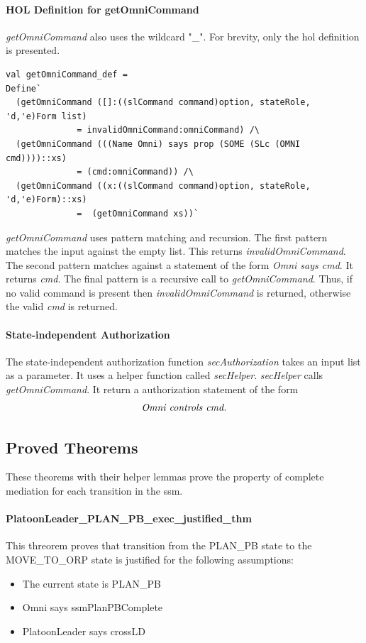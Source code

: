 \documentclass[../../main/main.tex]{subfiles}
\begin{document}
\paragraph*{HOL Definition for getOmniCommand}
\textit{getOmniCommand} also uses the wildcard "_".  For brevity, only the \gls{hol} definition is presented.

\begin{lstlisting}
val getOmniCommand_def =
Define`
  (getOmniCommand ([]:((slCommand command)option, stateRole, 'd,'e)Form list)
  		      = invalidOmniCommand:omniCommand) /\
  (getOmniCommand (((Name Omni) says prop (SOME (SLc (OMNI cmd))))::xs)
  		      = (cmd:omniCommand)) /\
  (getOmniCommand ((x:((slCommand command)option, stateRole, 'd,'e)Form)::xs)
  		      =  (getOmniCommand xs))`
\end{lstlisting}

\textit{getOmniCommand}  uses pattern matching and recursion.  The first pattern matches the input against the empty list.  This returns \textit{invalidOmniCommand}.  The second pattern matches against a statement of the form \textit{Omni says cmd}.  It returns \textit{cmd}.  The final pattern is a recursive call to \textit{getOmniCommand}.  Thus, if no valid command is present then \textit{invalidOmniCommand} is returned, otherwise the valid \textit{cmd} is returned.


\paragraph*{State-independent Authorization}
The state-independent authorization function \textit{secAuthorization} takes an input list as a parameter.  It uses a helper function called \textit{secHelper}.  \textit{secHelper} calls \textit{getOmniCommand}.  It return a authorization statement of the form 
\[\text{\textit{Omni controls cmd.}}\]


\HOLPBIntegratedDefDefinitionssecAuthorizationXXdef

\HOLDfnTag{PBIntegratedDef}{secHelper_def}\HOLPBIntegratedDefDefinitionssecHelperXXdef


\subsection{Proved Theorems}\label{ssec:ssmpbproved}
These theorems with their helper lemmas prove the property of complete mediation for each transition in the \gls{ssm}.

\paragraph*{PlatoonLeader_PLAN_PB_exec_justified_thm}
This threorem proves that transition from the PLAN_PB state to the MOVE_TO_ORP state is justified for the following assumptions:
\begin{itemize}
\item The current state is PLAN_PB
\item Omni says ssmPlanPBComplete
\item PlatoonLeader says crossLD
\end{itemize}
\end{document}
